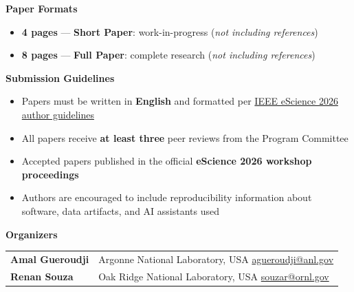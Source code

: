 \documentclass[10pt,a4paper]{article}
\newcommand{\ThinRule}{\noindent{\color{ruleblue}\rule{\linewidth}{0.5pt}}}
\begin{document}
\vspace{10pt}

{\color{navyblue}\large\textbf{Paper Formats}}
\ThinRule\vspace{4pt}

\begin{itemize}[leftmargin=16pt, itemsep=3pt, topsep=2pt]
  \item \textcolor{accent}{\textbf{4 pages}} --- \textbf{Short Paper}: work-in-progress (\emph{not including references})
  \item \textcolor{accent}{\textbf{8 pages}} --- \textbf{Full Paper}: complete research (\emph{not including references})
\end{itemize}

\vspace{10pt}

{\color{navyblue}\large\textbf{Submission Guidelines}}
\ThinRule\vspace{4pt}

\begin{itemize}[leftmargin=16pt, itemsep=1pt, topsep=2pt]
  \item Papers must be written in \textbf{English} and formatted per
        \href{https://www.escience-conference.org/2026/call-for-papers}{IEEE eScience 2026 author guidelines}
  \item All papers receive \textbf{at least three} peer reviews from the Program Committee
  \item Accepted papers published in the official \textbf{eScience 2026 workshop proceedings}
  \item Authors are encouraged to include reproducibility information about
        software, data artifacts, and AI assistants used
\end{itemize}

\vspace{10pt}

{\color{navyblue}\large\textbf{Organizers}}
\ThinRule\vspace{6pt}

\begin{tabular}{ll}
  \textbf{Amal Gueroudji} &
    \textcolor{midgray}{Argonne National Laboratory, USA} \quad
    \href{mailto:agueroudji@anl.gov}{agueroudji@anl.gov} \\[4pt]
  \textbf{Renan Souza} &
    \textcolor{midgray}{Oak Ridge National Laboratory, USA} \quad
    \href{mailto:souzar@ornl.gov}{souzar@ornl.gov} \\
\end{tabular}
\end{document}
